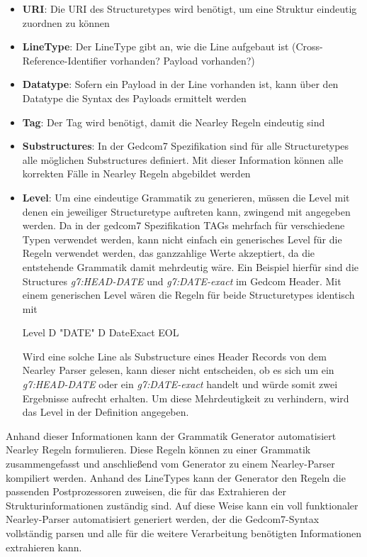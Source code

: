 \begin{itemize}
	\item \textbf{URI}: Die URI des Structuretypes wird benötigt, um eine Struktur eindeutig zuordnen zu können 
	\item \textbf{LineType}: Der LineType gibt an, wie die Line aufgebaut ist (Cross-Reference-Identifier vorhanden? Payload vorhanden?)
	\item \textbf{Datatype}: Sofern ein Payload in der Line vorhanden ist, kann über den Datatype die Syntax des Payloads ermittelt werden
	\item \textbf{Tag}: Der Tag wird benötigt, damit die Nearley Regeln eindeutig sind
	\item \textbf{Substructures}: In der Gedcom7 Spezifikation sind für alle Structuretypes alle möglichen Substructures definiert. Mit dieser Information können alle korrekten Fälle in Nearley Regeln abgebildet werden
	\item \textbf{Level}: Um eine eindeutige Grammatik zu generieren, müssen die Level mit denen ein jeweiliger Structuretype auftreten kann, zwingend mit angegeben werden. Da in der gedcom7 Spezifikation TAGs mehrfach für verschiedene Typen verwendet werden, kann nicht einfach ein generisches Level für die Regeln verwendet werden, das ganzzahlige Werte akzeptiert, da die entstehende Grammatik damit mehrdeutig wäre. Ein Beispiel hierfür sind die Structures \textit{g7:HEAD-DATE} und \textit{g7:DATE-exact} im Gedcom Header. Mit einem generischen Level wären die Regeln für beide Structuretypes identisch mit 
	\begin{center}
		Level  D  "DATE"  D  DateExact  EOL
	\end{center}
	Wird eine solche Line als Substructure eines Header Records von dem Nearley Parser gelesen, kann dieser nicht entscheiden, ob es sich um ein \textit{g7:HEAD-DATE} oder ein \textit{g7:DATE-exact} handelt und würde somit zwei Ergebnisse aufrecht erhalten. Um diese Mehrdeutigkeit zu verhindern, wird das Level in der Definition angegeben.
\end{itemize}
Anhand dieser Informationen kann der Grammatik Generator automatisiert Nearley Regeln formulieren. Diese Regeln können zu einer Grammatik zusammengefasst und anschließend vom Generator zu einem Nearley-Parser kompiliert werden. Anhand des LineTypes kann der Generator den Regeln die passenden Postprozessoren zuweisen, die für das Extrahieren der Strukturinformationen zuständig sind. Auf diese Weise kann ein voll funktionaler Nearley-Parser automatisiert generiert werden, der die Gedcom7-Syntax vollständig parsen und alle für die weitere Verarbeitung benötigten Informationen extrahieren kann. 


